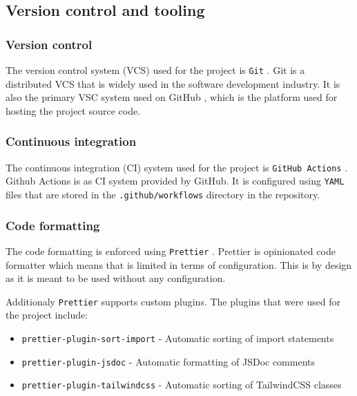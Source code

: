 \documentclass[../main.tex]{subfiles}
\begin{document}

\subsection{Version control and tooling}

\subsubsection{Version control}

The version control system (VCS) used for the project is \texttt{Git} \cite{git}. Git is a distributed VCS that is widely used in the software development industry.
It is also the primary VSC system used on GitHub \cite{github}, which is the platform used for hosting the project source code.


\subsubsection{Continuous integration}

The continuous integration (CI) system used for the project is \texttt{GitHub Actions} \cite{github-actions}.
Github Actions is as CI system provided by GitHub.
It is configured using \texttt{YAML} files that are stored in the \texttt{.github/workflows} directory in the repository.

\subsubsection{Code formatting}

The code formatting is enforced using \texttt{Prettier} \cite{prettier}.
Prettier is opinionated code formatter which means that is limited in terms of configuration.
This is by design as it is meant to be used without any configuration.

Additionaly \texttt{Prettier} supports custom plugins. The plugins that were used for the project include:

\begin{itemize}
  \item \texttt{prettier-plugin-sort-import} - Automatic sorting of import statements
  \item \texttt{prettier-plugin-jsdoc} - Automatic formatting of JSDoc \cite{jsdoc} comments
  \item \texttt{prettier-plugin-tailwindcss} - Automatic sorting of TailwindCSS \cite{tailwindcss} classes
\end{itemize}
\end{document}
